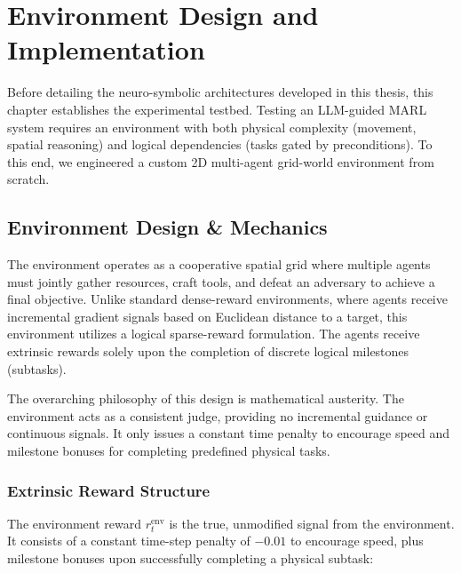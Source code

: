 \section{Environment Design and Implementation}
\label{ch:the_environment}

Before detailing the neuro-symbolic architectures developed in this thesis, this chapter establishes the experimental testbed. Testing an LLM-guided MARL system requires an environment with both physical complexity (movement, spatial reasoning) and logical dependencies (tasks gated by preconditions). To this end, we engineered a custom 2D multi-agent grid-world environment from scratch.

\subsection{Environment Design \& Mechanics}
\label{sec:env_design}

The environment operates as a cooperative spatial grid where multiple agents must jointly gather resources, craft tools, and defeat an adversary to achieve a final objective. Unlike standard dense-reward environments, where agents receive incremental gradient signals based on Euclidean distance to a target, this environment utilizes a logical sparse-reward formulation. The agents receive extrinsic rewards solely upon the completion of discrete logical milestones (subtasks).

The overarching philosophy of this design is mathematical austerity. The environment acts as a consistent judge, providing no incremental guidance or continuous signals. It only issues a constant time penalty to encourage speed and milestone bonuses for completing predefined physical tasks.

\subsubsection{Extrinsic Reward Structure}
The environment reward $r_t^{\text{env}}$ is the true, unmodified signal from the environment. It consists of a constant time-step penalty of $-0.01$ to encourage speed, plus milestone bonuses upon successfully completing a physical subtask:

